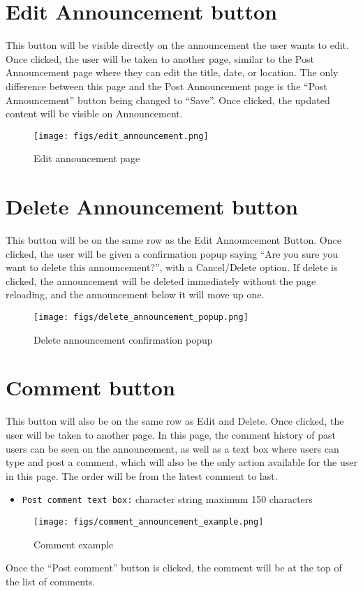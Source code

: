 \documentclass[conference]{IEEEtran}
\begin{document}
\section*{Edit Announcement button}
This button will be visible directly on the announcement the user wants to edit. Once clicked, the user will be taken to another page, similar to the Post Announcement page where they can edit the title, date, or location. The only difference between this page and the Post Announcement page is the “Post Announcement” button being changed to “Save”. Once clicked, the updated content will be visible on Announcement.
    \begin{figure}[H]
    \centering
    \texttt{[image: figs/edit\_announcement.png]}
    \caption{Edit announcement page}
    \label{fig:Edit announcement page}
    \end{figure}

\section*{Delete Announcement button}
This button will be on the same row as the Edit Announcement Button. Once clicked, the user will be given a confirmation popup saying “Are you sure you want to delete this announcement?”, with a Cancel/Delete option. If delete is clicked,  the announcement will be deleted immediately without the page reloading, and the announcement below it will move up one.
    \begin{figure}[H]
    \centering
    \texttt{[image: figs/delete\_announcement\_popup.png]}
    \caption{Delete announcement confirmation popup}
    \label{fig:Delete announcement confirmation popup}
    \end{figure}

\section*{Comment button}
This button will also be on the same row as Edit and Delete. Once clicked, the user will be taken to another page. In this page, the comment history of past users can be seen on the announcement, as well as a text box where users can type and post a comment, which will also be the only action available for the user in this page.  The order will be from the latest comment to last.
\begin{itemize}
    \item \texttt{Post comment text box:} character string maximum 150 characters
\end{itemize}
    \begin{figure}[H]
    \centering
    \texttt{[image: figs/comment\_announcement\_example.png]}
    \caption{Comment example}
    \label{fig:Comment example}
    \end{figure}
Once the “Post comment” button is clicked, the comment will be at the top of the list of comments.
\end{document}
